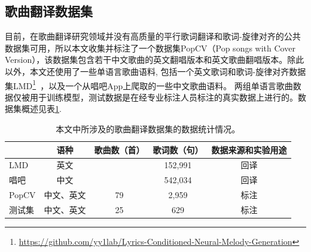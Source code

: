 \subsection{歌曲翻译数据集}
目前，在歌曲翻译研究领域并没有高质量的平行歌词翻译和歌词-旋律对齐的公共数据集可用，所以本文收集并标注了一个数据集PopCV（Pop songs with Cover Version），该数据集包含若干中文歌曲的英文翻唱版本和英文歌曲翻唱版本。除此以外，本文还使用了一些单语言歌曲语料, 包括一个英文歌词和歌词-旋律对齐数据集LMD\footnote{\url{https://github.com/yy1lab/Lyrics-Conditioned-Neural-Melody-Generation}}~\citep{LMD}，以及一个从唱吧App上爬取的一些中文歌曲语料。
两组单语言歌曲数据仅被用于训练模型，测试数据是在经专业标注人员标注的真实数据上进行的。数据集概述见表\ref{tab:dataset_stat}.
\begin{table}[htbp]
    \centering
    \setlength{\belowcaptionskip}{8pt} %
    \caption{本文中所涉及的歌曲翻译数据集的数据统计情况。}
    \begin{tabular}{|l|c|c|c|c|}
    \hline
         & 语种 & 歌曲数（首） & 歌词数（句） & 数据来源和实验用途\\
    \hline
     LMD & 英文 & \diagbox[]{}{} & 152,991 & 回译\\
    \hline
     唱吧 & 中文 & \diagbox[]{}{} & 542,034 & 回译\\
    \hline
     PopCV & 中文、英文 & 79 & 2,959 & 标注\\
    \hline
     测试集 & 中文、英文 & 25 & 629 & 标注\\
    \hline
    \end{tabular}
    \label{tab:dataset_stat}
\end{table}
